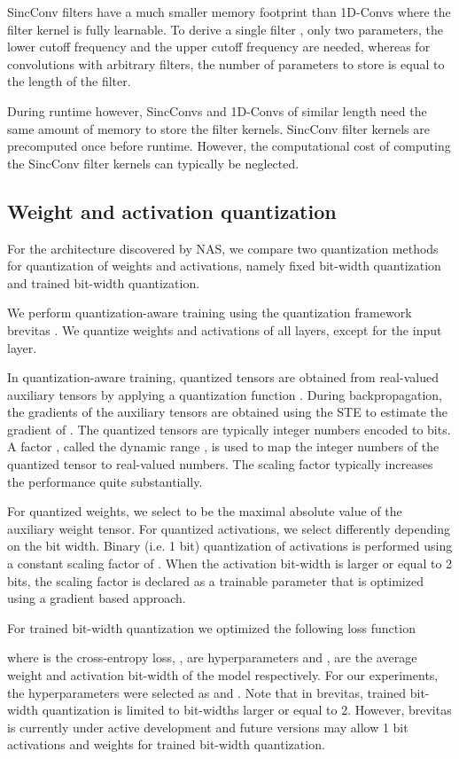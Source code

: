 \documentclass[a4paper]{article}
\begin{document}
SincConv filters have a much smaller memory footprint than 1D-Convs where the filter kernel is fully learnable. To derive a single filter , only two parameters, the lower cutoff frequency  and the upper cutoff frequency  are needed, whereas for convolutions with arbitrary filters, the number of parameters to store is equal to the length of the filter.

During runtime however, SincConvs and 1D-Convs of similar length need the same amount of memory to store the filter kernels. SincConv filter kernels are precomputed once before runtime. However, the computational cost of computing the SincConv filter kernels can typically be neglected.

\subsection{Weight and activation quantization}
For the architecture discovered by NAS, we compare two quantization methods for quantization of weights and activations, namely fixed bit-width quantization and trained bit-width quantization.

We perform quantization-aware training using the quantization framework brevitas \cite{brevitas}. We quantize weights and activations of all layers, except for the input layer.

In quantization-aware training, quantized tensors are obtained from real-valued auxiliary tensors by applying a quantization function . During backpropagation, the gradients of the auxiliary tensors are obtained using the STE to estimate the gradient of . The quantized tensors are typically integer numbers encoded to  bits. A factor , called the dynamic range \cite{Uhlich2019,Jain2020,Esser2020}, is used to map the integer numbers of the quantized tensor to real-valued numbers. The scaling factor typically increases the performance quite substantially.

For quantized weights, we select  to be the maximal absolute value of the auxiliary weight tensor. For quantized activations, we select  differently depending on the bit width. Binary (i.e. 1 bit) quantization of activations is performed using a constant scaling factor of . When the activation bit-width is larger or equal to 2 bits, the scaling factor  is declared as a trainable parameter that is optimized using a gradient based approach.

For trained bit-width quantization we optimized the following loss function

where  is the cross-entropy loss, ,  are hyperparameters and ,  are the average weight and activation bit-width of the model respectively. For our experiments, the hyperparameters were selected as  and . Note that in brevitas, trained bit-width quantization is limited to bit-widths larger or equal to 2. However, brevitas is currently under active development and future versions may allow 1 bit activations and weights for trained bit-width quantization.
\end{document}
